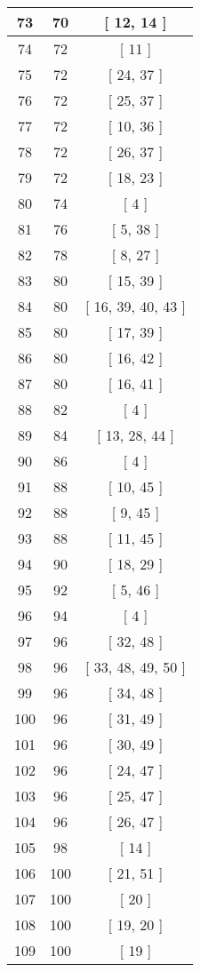 \begin{center}
\begin{longtable}[H]{|| c c c ||}
73 & 70 & [ 12, 14 ] \\ 
\hline
74 & 72 & [ 11 ] \\ 
\hline
75 & 72 & [ 24, 37 ] \\ 
\hline
76 & 72 & [ 25, 37 ] \\ 
\hline
77 & 72 & [ 10, 36 ] \\ 
\hline
78 & 72 & [ 26, 37 ] \\ 
\hline
79 & 72 & [ 18, 23 ] \\ 
\hline
80 & 74 & [ 4 ] \\ 
\hline
81 & 76 & [ 5, 38 ] \\ 
\hline
82 & 78 & [ 8, 27 ] \\ 
\hline
83 & 80 & [ 15, 39 ] \\ 
\hline
84 & 80 & [ 16, 39, 40, 43 ] \\ 
\hline
85 & 80 & [ 17, 39 ] \\ 
\hline
86 & 80 & [ 16, 42 ] \\ 
\hline
87 & 80 & [ 16, 41 ] \\ 
\hline
88 & 82 & [ 4 ] \\ 
\hline
89 & 84 & [ 13, 28, 44 ] \\ 
\hline
90 & 86 & [ 4 ] \\ 
\hline
91 & 88 & [ 10, 45 ] \\ 
\hline
92 & 88 & [ 9, 45 ] \\ 
\hline
93 & 88 & [ 11, 45 ] \\ 
\hline
94 & 90 & [ 18, 29 ] \\ 
\hline
95 & 92 & [ 5, 46 ] \\ 
\hline
96 & 94 & [ 4 ] \\ 
\hline
97 & 96 & [ 32, 48 ] \\ 
\hline
98 & 96 & [ 33, 48, 49, 50 ] \\ 
\hline
99 & 96 & [ 34, 48 ] \\ 
\hline
100 & 96 & [ 31, 49 ] \\ 
\hline
101 & 96 & [ 30, 49 ] \\ 
\hline
102 & 96 & [ 24, 47 ] \\ 
\hline
103 & 96 & [ 25, 47 ] \\ 
\hline
104 & 96 & [ 26, 47 ] \\ 
\hline
105 & 98 & [ 14 ] \\ 
\hline
106 & 100 & [ 21, 51 ] \\ 
\hline
107 & 100 & [ 20 ] \\ 
\hline
108 & 100 & [ 19, 20 ] \\ 
\hline
109 & 100 & [ 19 ] \\ 

\end{longtable}
\end{center}
